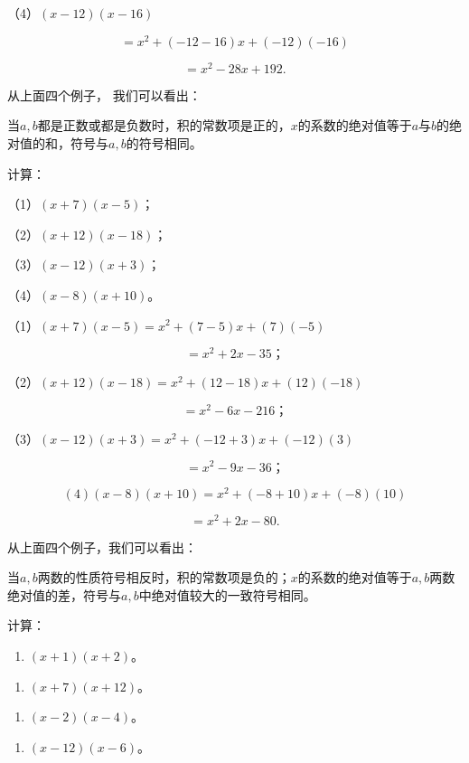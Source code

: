 （4）\((x - 12)(x - 16)\)

\[
= x ^{2} + (- 12 - 16) x + (- 12) (- 16)
\]

\[
= x ^{2} - 28 x + 192.
\]

从上面四个例子， 我们可以看出：

当\(a, b\)都是正数或都是负数时，积的常数项是正的，\(x\)的系数的绝对值等于\(a\)与\(b\)的绝对值的和，符号与\(a, b\)的符号相同。

 计算：

（1）\((x + 7)(x - 5)\)；

（2）\((x + 12)(x - 18)\)；

（3）\((x - 12)(x + 3)\)；

（4）\((x - 8)(x + 10)\)。

 （1）\((x + 7)(x - 5) = x^{2} + (7 - 5)x + (7)(-5)\)

\[
= x ^{2} + 2 x - 35\text{；}
\]

（2）\((x + 12)(x - 18) = x^2 + (12 - 18)x + (12)(-18)\)

\[
= x ^{2} - 6 x - 216\text{；}
\]

（3）\((x - 12)(x + 3) = x^2 + (-12 + 3)x + (-12)(3)\)

\[
= x ^{2} - 9 x - 36\text{；}
\]

\[
(4) (x - 8) (x + 10) = x ^{2} + (- 8 + 10) x + (- 8) (10)
\]

\[
= x ^{2} + 2 x - 80.
\]

从上面四个例子，我们可以看出：

当\(a, b\)两数的性质符号相反时，积的常数项是负的；\(x\)的系数的绝对值等于\(a, b\)两数绝对值的差，符号与\(a, b\)中绝对值较大的一致符号相同。

计算：

\begin{enumerate}[start=1]
\item
  \((x + 1)(x + 2)\)。
\end{enumerate}

\begin{enumerate}[start=3]
\item
  \((x + 7)(x + 12)\)。
\end{enumerate}

\begin{enumerate}[start=5]
\item
  \((x - 2)(x - 4)\)。
\end{enumerate}

\begin{enumerate}[start=7]
\item
  \((x - 12)(x - 6)\)。
\end{enumerate}

